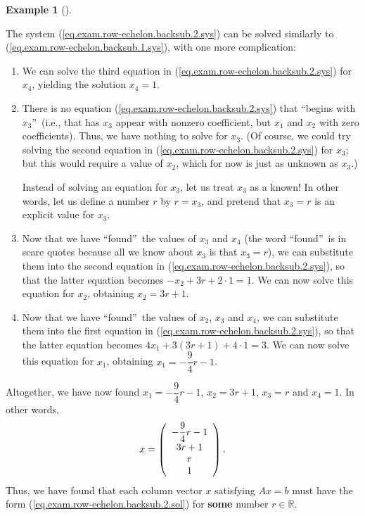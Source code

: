 \documentclass[numbers=enddot,12pt,final,onecolumn,notitlepage]{scrartcl}%
\theoremstyle{definition}
\newtheorem{exam}[theo]{Example}
\newenvironment{example}[1][]
{\begin{exam}[#1]\begin{leftbar}}
{\end{leftbar}\end{exam}}
\begin{document}
\begin{example}
The system (\ref{eq.exam.row-echelon.backsub.2.sys}) can be solved similarly
to (\ref{eq.exam.row-echelon.backsub.1.sys}), with one more complication:

\begin{enumerate}
\item We can solve the third equation in
(\ref{eq.exam.row-echelon.backsub.2.sys}) for $x_{4}$, yielding the solution
$x_{4}=1$.

\item There is no equation (\ref{eq.exam.row-echelon.backsub.2.sys}) that
\textquotedblleft begins with $x_{3}$\textquotedblright\ (i.e., that has
$x_{3}$ appear with nonzero coefficient, but $x_{1}$ and $x_{2}$ with zero
coefficients). Thus, we have nothing to solve for $x_{3}$. (Of course, we
could try solving the second equation in
(\ref{eq.exam.row-echelon.backsub.2.sys}) for $x_{3}$; but this would require
a value of $x_{2}$, which for now is just as unknown as $x_{3}$.)

Instead of solving an equation for $x_{3}$, let us treat $x_{3}$ as a known!
In other words, let us define a number $r$ by $r=x_{3}$, and pretend that
$x_{3}=r$ is an explicit value for $x_{3}$.

\item Now that we have \textquotedblleft found\textquotedblright\ the values
of $x_{3}$ and $x_{4}$ (the word \textquotedblleft found\textquotedblright\ is
in scare quotes because all we know about $x_{3}$ is that $x_{3}=r$), we can
substitute them into the second equation in
(\ref{eq.exam.row-echelon.backsub.2.sys}), so that the latter equation becomes
$-x_{2}+3r+2\cdot1=1$. We can now solve this equation for $x_{2}$, obtaining
$x_{2}=3r+1$.

\item Now that we have \textquotedblleft found\textquotedblright\ the values
of $x_{2}$, $x_{3}$ and $x_{4}$, we can substitute them into the first
equation in (\ref{eq.exam.row-echelon.backsub.2.sys}), so that the latter
equation becomes $4x_{1}+3\left(  3r+1\right)  +4\cdot1=3$. We can now solve
this equation for $x_{1}$, obtaining $x_{1}=-\dfrac{9}{4}r-1$.
\end{enumerate}

Altogether, we have now found $x_{1}=-\dfrac{9}{4}r-1$, $x_{2}=3r+1$,
$x_{3}=r$ and $x_{4}=1$. In other words,
\begin{equation}
x=\left(
\begin{array}
[c]{c}%
-\dfrac{9}{4}r-1\\
3r+1\\
r\\
1
\end{array}
\right)  . \label{eq.exam.row-echelon.backsub.2.sol}%
\end{equation}
Thus, we have found that each column vector $x$ satisfying $Ax=b$ must have
the form (\ref{eq.exam.row-echelon.backsub.2.sol}) for \textbf{some} number
$r\in\mathbb{R}$.


\end{example}
\end{document}
